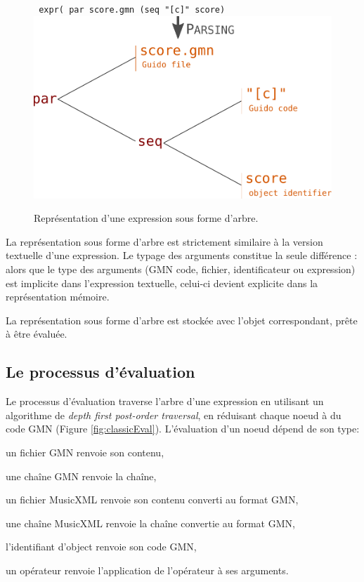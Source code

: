 \documentclass{article}
\newcommand{\OSC}[1]	{{\fontsize{10pt}{10pt} \selectfont\texttt{#1}}}
\newcommand{\oper}[1]	{\textcolor{figRed}{#1}}
\newcommand{\param}[1]	{\textcolor{figOrange}{#1}}
\let\olditemize\itemize
\let\oldenditemize\enditemize
\renewenvironment{itemize} 	{\olditemize \setlength{\itemsep}{1mm}}{\oldenditemize}
\begin{document}
\begin{figure}[th]
\centering
\OSC{ expr( \oper{par} \param{score.gmn}  (\oper{seq} \param{"[c]" score})}
\includegraphics[width=0.8\columnwidth]{imgs/exprParse}
\caption{Représentation d'une expression sous forme d'arbre.
\label{fig:parsing}}
\end{figure}

La représentation sous forme d'arbre est strictement similaire à la version textuelle d'une expression. Le typage des arguments constitue la seule différence : alors que le type des arguments (GMN code, fichier, identificateur ou expression) est implicite dans l'expression textuelle, celui-ci devient explicite dans la représentation mémoire. 

La représentation sous forme d'arbre est stockée avec l'objet correspondant, prête à être évaluée.

\subsection{Le processus d'évaluation}
Le processus d'évaluation traverse l'arbre d'une expression en utilisant un algorithme de \textit{depth first post-order traversal}, en réduisant chaque noeud à du code GMN (Figure \ref{fig:classicEval}).
L'évaluation d'un noeud dépend de son type:
\begin{itemize}
\item un fichier GMN renvoie son contenu,
\item une chaîne GMN renvoie la chaîne,
\item un fichier MusicXML renvoie son contenu converti au format GMN,
\item une chaîne MusicXML renvoie la chaîne convertie au format GMN,
\item l'identifiant d'object renvoie son code GMN,
\item un opérateur renvoie l'application de l'opérateur à ses arguments.
\end{itemize}
\end{document}
